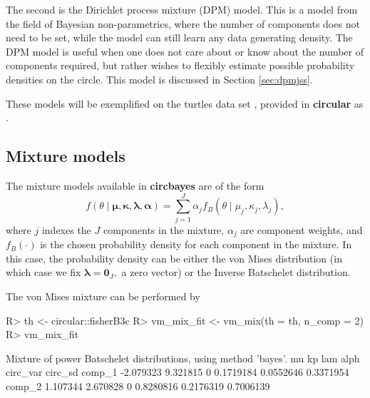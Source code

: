 \documentclass{article}
\newcommand{\code}[1]{\texttt{\detokenize{#1}}}
\newcommand{\pkg}[1]{\textbf{#1}}
\newenvironment{CodeChunk}{}{}
\begin{document}
The second is the Dirichlet process mixture (DPM) model. This is a model
from the field of Bayesian non-parametrics, where the number of
components does not need to be set, while the model can still learn any
data generating density. The DPM model is useful when one does not care
about or know about the number of components required, but rather wishes
to flexibly estimate possible probability densities on the circle. This
model is discussed in Section \ref{sec:dpmjss}.

These models will be exemplified on the turtles data set
\citep{stephens1969techniques, fisher1995statistical}, provided in
\pkg{circular} as \code{circular::fisherB3c}.

\hypertarget{mixture-models}{%
	\subsection{Mixture models}\label{mixture-models}}

\label{mixmod}

The mixture models available in \pkg{circbayes} are of the form
\begin{equation}
f(\theta \mid \boldsymbol{\mu}, \boldsymbol{\kappa}, \boldsymbol{\lambda}, \boldsymbol{\alpha}) = \sum_{j = 1}^J\alpha_j f_B(\theta \mid \mu_j, \kappa_j, \lambda_j),
\end{equation} where \(j\) indexes the \(J\) components in the mixture,
\(\alpha_j\) are component weights, and \(f_B(\cdot)\) is the chosen
probability density for each component in the mixture. In this case, the
probability density can be either the von Mises distribution (in which
case we fix \(\boldsymbol{\lambda}= \boldsymbol{0}_J,\) a zero vector)
or the Inverse Batschelet distribution.

The von Mises mixture can be performed by

\begin{CodeChunk}
	
	\begin{CodeInput}
		R> th <- circular::fisherB3c
		R> vm_mix_fit <- vm_mix(th = th, n_comp = 2)
		R> vm_mix_fit
	\end{CodeInput}
	
	\begin{CodeOutput}
		Mixture of power Batschelet distributions, using method 'bayes'.
		mu       kp lam      alph  circ_var   circ_sd
		comp_1 -2.079323 9.321815   0 0.1719184 0.0552646 0.3371954
		comp_2  1.107344 2.670828   0 0.8280816 0.2176319 0.7006139
	\end{CodeOutput}
\end{CodeChunk}
\end{document}
